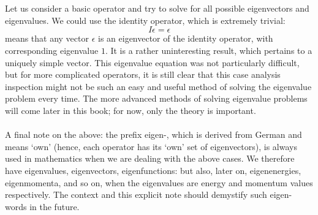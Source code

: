 \\\\
Let us consider a basic operator and try to solve for all possible eigenvectors and eigenvalues. We could use the identity operator, which is extremely trivial:
$$
I\epsilon = \epsilon
$$ means that any vector $\epsilon$ is an eigenvector of the identity operator, with corresponding eigenvalue $1$. It is a rather uninteresting result, which pertains to a uniquely simple vector. This eigenvalue equation was not particularly difficult, but for more complicated operators, it is still clear that this case analysis inspection might not be such an easy and useful method of solving the eigenvalue problem every time. The more advanced methods of solving eigenvalue problems will come later in this book; for now, only the theory is important.
\\\\
A final note on the above: the prefix eigen-, which is derived from German and means `own' (hence, each operator has its `own' set of eigenvectors), is always used in mathematics when we are dealing with the above cases. We therefore have eigenvalues, eigenvectors, eigenfunctions: but also, later on, eigenenergies, eigenmomenta, and so on, when the eigenvalues are energy and momentum values respectively. The context and this explicit note should demystify such eigen- words in the future.
